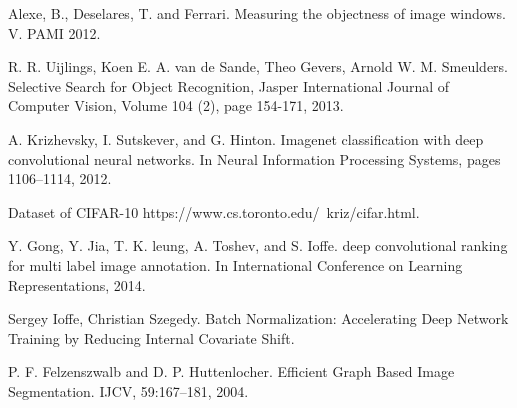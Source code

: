   Alexe, B., Deselares, T. and Ferrari.
 Measuring the objectness of image windows. V. PAMI 2012.
 
  R. R. Uijlings, Koen E. A. van de Sande, Theo Gevers, Arnold W. M. Smeulders. 
Selective Search for Object Recognition, Jasper  International Journal of Computer Vision, Volume 104 (2), page 154-171, 2013.
 

 A. Krizhevsky, I. Sutskever, and G. Hinton. Imagenet classification with deep convolutional neural networks. In Neural
Information Processing Systems, pages 1106–1114, 2012.

 Dataset of CIFAR-10 https://www.cs.toronto.edu/~kriz/cifar.html.


 Y. Gong, Y. Jia, T. K. leung, A. Toshev, and S. Ioffe. deep
convolutional ranking for multi label image annotation. In
International Conference on Learning Representations, 2014.

 Sergey Ioffe, Christian Szegedy.
 Batch Normalization: Accelerating Deep Network Training by Reducing
Internal Covariate Shift.

 P. F. Felzenszwalb and D. P. Huttenlocher. Efficient Graph Based Image Segmentation. IJCV, 59:167–181, 2004.
